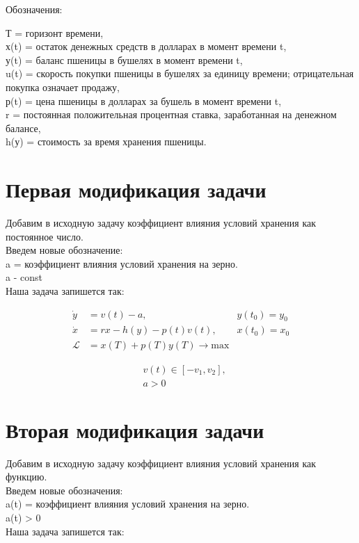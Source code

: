 Обозначения:
 
{Т} = горизонт времени,\\
{х(t)} = остаток денежных средств в долларах в момент времени t,\\
{у(t)} = баланс пшеницы в бушелях в момент времени t,\\ 
{u(t)} = скорость покупки пшеницы в бушелях за единицу времени; отрицательная покупка означает продажу,\\
{р(t)} = цена пшеницы в долларах за бушель в момент времени t,\\
{r} = постоянная положительная процентная ставка, заработанная на денежном балансе,\\
{h(у)} = стоимость за время хранения пшеницы.

\section{Первая модификация задачи}

Добавим в исходную задачу коэффициент влияния условий хранения как постоянное число.\\

Введем новые обозначение:\\
{a} = коэффициент влияния условий хранения на зерно.\\
a - const\\
Наша задача запишется так:

\begin{align}
    \Dot{y} & = v(t) - a, & y(t_{0}) = y_{0} \\
    \Dot{x} & = r x - h(y) - p(t) v(t), & x(t_{0}) = x_{0} \\
    \mathcal{L} & = x(T) + p(T) y(T) \to \mathrm{max}
\end{align}

\begin{align}
    & v(t) \in [-v_{1}, v_{2}], \\
    & a > 0
\end{align}




\section{Вторая модификация задачи}


Добавим в исходную задачу коэффициент влияния условий хранения как функцию.\\
Введем новые обозначения:\\
{a(t)} = коэффициент влияния условий хранения на зерно.\\
a(t) > 0\\
 Наша задача запишется так:\\

